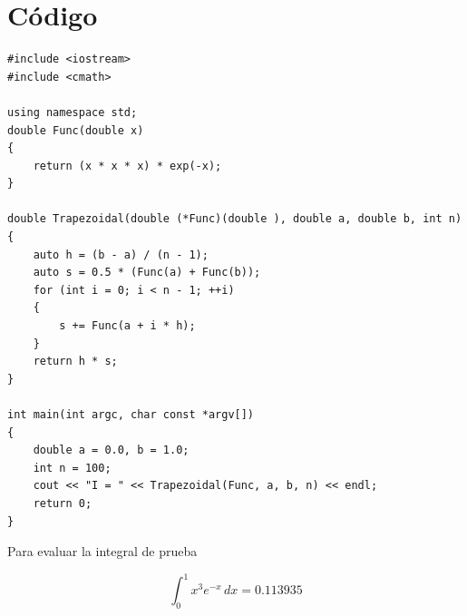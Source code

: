 \section{Código}
\begin{verbatim}
#include <iostream>
#include <cmath>

using namespace std;
double Func(double x)
{
    return (x * x * x) * exp(-x);
}

double Trapezoidal(double (*Func)(double ), double a, double b, int n)
{
    auto h = (b - a) / (n - 1);
    auto s = 0.5 * (Func(a) + Func(b));
    for (int i = 0; i < n - 1; ++i)
    {
        s += Func(a + i * h);
    }
    return h * s;
}

int main(int argc, char const *argv[])
{
    double a = 0.0, b = 1.0;
    int n = 100;
    cout << "I = " << Trapezoidal(Func, a, b, n) << endl;
    return 0;
}
\end{verbatim}

Para evaluar la integral de prueba 

\begin{equation*}
    \int_0^1 x^3 e^{-x}\,dx = 0.113935
\end{equation*}


